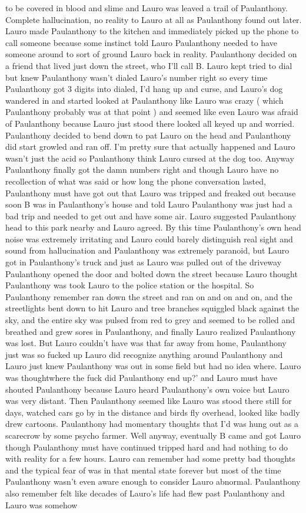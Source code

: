 \documentclass[12pt]{book}
\begin{document}
to be covered in blood and slime and Lauro was leaved a trail of Paulanthony. Complete hallucination, no reality to Lauro at all as Paulanthony found out later. Lauro made Paulanthony to the kitchen and immediately picked up the phone to call someone because some instinct told Lauro Paulanthony needed to have someone around to sort of ground Lauro back in reality. Paulanthony decided on a friend that lived just down the street, who I'll call B. Lauro kept tried to dial but knew Paulanthony wasn't dialed Lauro's number right so every time Paulanthony got 3 digits into dialed, I'd hang up and curse, and Lauro's dog wandered in and started looked at Paulanthony like Lauro was crazy ( which Paulanthony probably was at that point ) and seemed like even Lauro was afraid of Paulanthony because Lauro just stood there looked all keyed up and worried. Paulanthony decided to bend down to pat Lauro on the head and Paulanthony did start growled and ran off. I'm pretty sure that actually happened and Lauro wasn't just the acid so Paulanthony think Lauro cursed at the dog too. Anyway Paulanthony finally got the damn numbers right and though Lauro have no recollection of what was said or how long the phone conversation lasted, Paulanthony must have got out that Lauro was tripped and freaked out because soon B was in Paulanthony's house and told Lauro Paulanthony was just had a bad trip and needed to get out and have some air. Lauro suggested Paulanthony head to this park nearby and Lauro agreed. By this time Paulanthony's own head noise was extremely irritating and Lauro could barely distinguish real sight and sound from hallucination and Paulanthony was extremely paranoid, but Lauro got in Paulanthony's truck and just as Lauro was pulled out of the driveway Paulanthony opened the door and bolted down the street because Lauro thought Paulanthony was took Lauro to the police station or the hospital. So Paulanthony remember ran down the street and ran on and on and on, and the streetlights bent down to hit Lauro and tree branches squiggled black against the sky, and the entire sky was pulsed from red to grey and seemed to be rolled and breathed and grew sores in Paulanthony, and finally Lauro realized Paulanthony was lost. But Lauro couldn't have was that far away from home, Paulanthony just was so fucked up Lauro did recognize anything around Paulanthony and Lauro just knew Paulanthony was out in some field but had no idea where. Lauro was thoughtwhere the fuck did Paulanthony end up?' and Lauro must have shouted Paulanthony because Lauro heard Paulanthony's own voice but Lauro was very distant. Then Paulanthony seemed like Lauro was stood there still for days, watched cars go by in the distance and birds fly overhead, looked like badly drew cartoons. Paulanthony had momentary thoughts that I'd was hung out as a scarecrow by some psycho farmer. Well anyway, eventually B came and got Lauro though Paulanthony must have continued tripped hard and had nothing to do with reality for a few hours. Lauro can remember had some pretty bad thoughts and the typical fear of was in that mental state forever but most of the time Paulanthony wasn't even aware enough to consider Lauro abnormal. Paulanthony also remember felt like decades of Lauro's life had flew past Paulanthony and Lauro was somehow 
\end{document}
